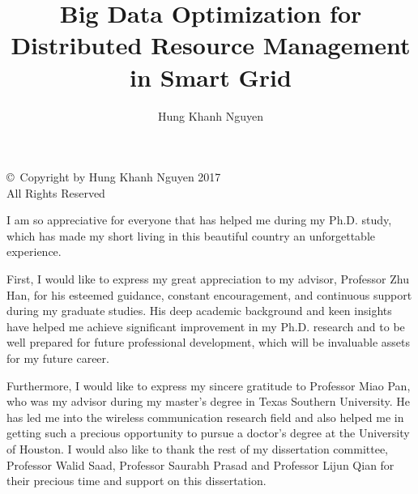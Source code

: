 \documentclass[11pt,ECE_Dissertation_Style]{report}
\numberwithin{algorithm}{chapter}
\begin{document}
\thispagestyle{empty}
        \null\vfill
        \begin{center}
                \Large\copyright\ Copyright by Hung Khanh Nguyen 2017\\
                All Rights Reserved
        \end{center}
        \vfill\newpage

\title{Big Data Optimization for Distributed Resource Management \\in Smart Grid}
\author{Hung Khanh Nguyen}



\makecoverpages
{}
\acknowledgements
\setcounter{page}{5}
\par I am so appreciative for everyone that has helped me during my Ph.D. study, which has made my short living in this beautiful country an unforgettable experience.

\par First, I would like to express my great appreciation to my advisor, Professor Zhu Han, for his esteemed guidance, constant encouragement, and continuous support during my graduate studies. His deep academic background and keen insights have helped me achieve significant improvement in my Ph.D. research and to be well prepared for future professional development, which will be invaluable assets for my future career.

\par Furthermore, I would like to express my sincere gratitude to Professor Miao Pan, who was my advisor during my master's degree in Texas Southern University. He has led me into the wireless communication research field and also helped me in getting such a precious opportunity to pursue a doctor's degree at the University of Houston. I would also like to thank the rest of my dissertation committee, Professor Walid Saad, Professor Saurabh Prasad and Professor Lijun Qian for their precious time and support on this dissertation.
\end{document}

